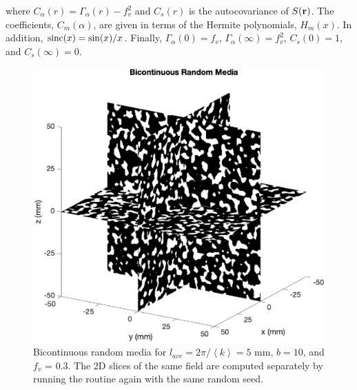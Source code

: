 \noindent where $C_{\alpha}(r) = \Gamma_{\alpha}(r) - f_v^2$ and $C_s(r)$ is the autocovariance of $S(\mathbf{r})$. The coefficients, $C_m(\alpha)$, are given in terms of the Hermite polynomials, $H_m(x)$. In addition, $\textrm{sinc}(x) = \sin(x)/x$.  Finally, $\Gamma_{\alpha}(0) = f_v$, $\Gamma_{\alpha}(\infty) = f_v^2$, $C_s(0) = 1$, and $C_s(\infty) = 0$. 

%
%
%
%

 \begin{figure}[H] 
 \centering
   \includegraphics[width=4.5in]{RandomObjects/Figures/bicont} 
      \caption{Bicontinuous random media for $l_{ave} = 2\pi/\left< k\right> = 5$ mm, $b= 10$, and $f_v$ = 0.3. The 2D slices of the same field are computed separately by running the routine again with the same random seed. }
\end{figure}



